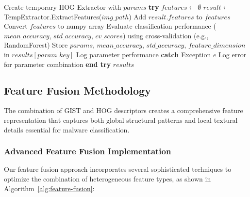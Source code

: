 \begin{algorithm}[!htbp]
\begin{algorithmic}[1]
        \State Create temporary HOG Extractor with $params$
        \State \textbf{try}
            \State $features \leftarrow \emptyset$
                \State $result \leftarrow$ TempExtractor.ExtractFeatures($img\_path$)
                \State Add $result.features$ to $features$
            \EndFor
            \State Convert $features$ to numpy array
            \State Evaluate classification performance ($mean\_accuracy$, $std\_accuracy$, $cv\_scores$) using cross-validation (e.g., RandomForest)
            \State Store $params$, $mean\_accuracy$, $std\_accuracy$, $feature\_dimension$ in $results[param\_key]$
            \State Log parameter performance
        \State \textbf{catch} {Exception $e$}
            \State Log error for parameter combination
        \State \textbf{end try}
    \EndFor
    \Return $results$
\EndProcedure
\end{algorithmic}
\end{algorithm}

\subsection{Feature Fusion Methodology}
\label{subsec:feature-fusion}

The combination of GIST and HOG descriptors creates a comprehensive feature representation that captures both global structural patterns and local textural details essential for malware classification.

\subsubsection{Advanced Feature Fusion Implementation}

Our feature fusion approach incorporates several sophisticated techniques to optimize the combination of heterogeneous feature types, as shown in Algorithm~\ref{alg:feature-fusion}:

